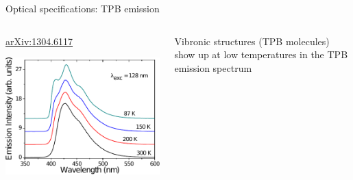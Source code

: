 \documentclass[10pt,aspectratio=169]{beamer}
\newcommand{\arxiv}[1]{\href{https://arxiv.org/abs/#1}{\smaller\ttfamily arXiv:#1}}
\begin{document}
\begin{frame}{Optical specifications: TPB emission}
  \begin{columns}
    \begin{column}{0.5\textwidth}
      \begin{center}
        \arxiv{1304.6117}
      \end{center}
      \includegraphics[width=\columnwidth]{tpb-emission-paper.pdf}
    \end{column}
    \begin{column}{0.5\textwidth}\setlength{\parskip}{12pt}%
      Vibronic structures (TPB molecules) show up at low temperatures in the
      TPB emission spectrum
    \end{column}
  \end{columns}
\end{frame}
\end{document}
